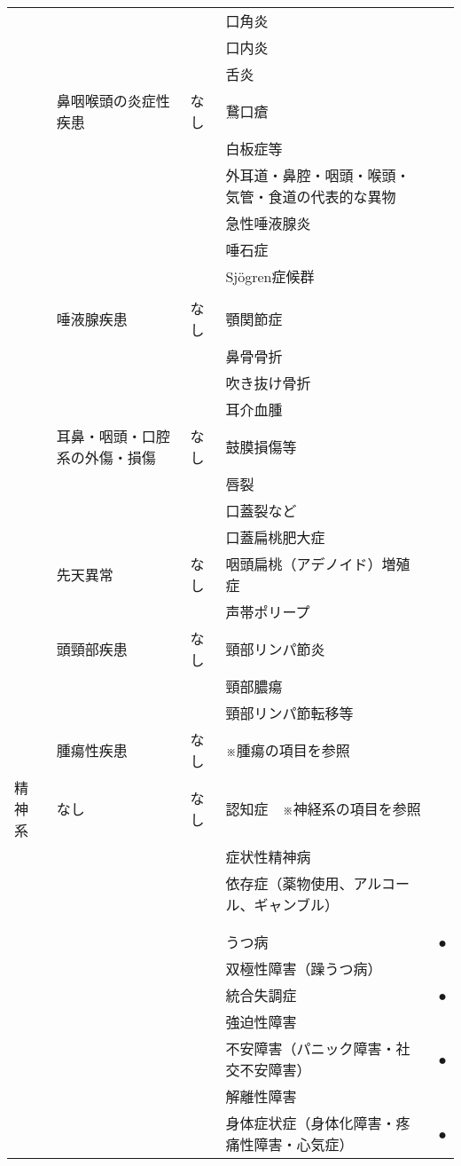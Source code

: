 \begin{xltabular}{\linewidth}{XXXXX}
 &  &  & 口角炎 &  \\
 &  &  & 口内炎 &  \\
 &  &  & 舌炎 &  \\
 & 鼻咽喉頭の炎症性疾患 & なし & 鵞口瘡 &  \\
 &  &  & 白板症等 &  \\
 &  &  & 外耳道・鼻腔・咽頭・喉頭・気管・食道の代表的な異物 &  \\
 &  &  & 急性唾液腺炎 &  \\
 &  &  & 唾石症 &  \\
 &  &  & Sjögren症候群 &  \\
 &  &  &  &  \\
 & 唾液腺疾患 & なし & 顎関節症 &  \\
 &  &  & 鼻骨骨折 &  \\
 &  &  & 吹き抜け骨折 &  \\
 &  &  & 耳介血腫 &  \\
 & 耳鼻・咽頭・口腔系の外傷・損傷 & なし & 鼓膜損傷等 &  \\
 &  &  & 唇裂 &  \\
 &  &  & 口蓋裂など &  \\
 &  &  & 口蓋扁桃肥大症 &  \\
 & 先天異常 & なし & 咽頭扁桃（アデノイド）増殖症 &  \\
 &  &  & 声帯ポリープ &  \\
 & 頭頸部疾患 & なし & 頸部リンパ節炎 &  \\
 &  &  & 頸部膿瘍 &  \\
 &  &  & 頸部リンパ節転移等 &  \\
 & 腫瘍性疾患 & なし & ※腫瘍の項目を参照 &  \\
精神系 & なし & なし & 認知症　※神経系の項目を参照 &  \\
 &  &  & 症状性精神病 &  \\
 &  &  & 依存症（薬物使用、アルコール、ギャンブル） &  \\
 &  &  &  &  \\
 &  &  &  &  \\
 &  &  & うつ病 & ● \\
 &  &  & 双極性障害（躁うつ病） &  \\
 &  &  & 統合失調症 & ● \\
 &  &  & 強迫性障害 &  \\
 &  &  & 不安障害（パニック障害・社交不安障害） & ● \\
 &  &  & 解離性障害 &  \\
 &  &  & 身体症状症（身体化障害・疼痛性障害・心気症） & ● \\

\end{xltabular}
